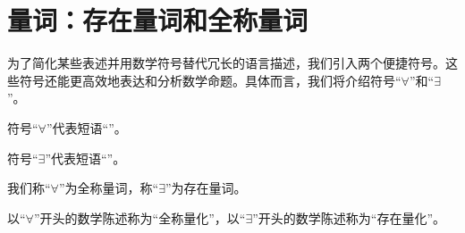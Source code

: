 \section{量词：存在量词和全称量词}

为了简化某些表述并用数学符号替代冗长的语言描述，我们引入两个便捷符号。这些符号还能更高效地表达和分析数学命题。具体而言，我们将介绍符号``$\forall$''和``$\exists$''。

\begin{definition}
    符号``$\forall$''代表短语``''。

    符号``$\exists$''代表短语``''。

    我们称``$\forall$''为全称量词，称``$\exists$''为存在量词。

    以``$\forall$''开头的数学陈述称为``全称量化''，以``$\exists$''开头的数学陈述称为``存在量化''。
\end{definition}









